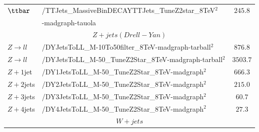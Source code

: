 \begin{table}[!ht]
\begin{center}
{\begin{tabular}{|l|l|c|}
$\ttbar$                           &   /TTJets\_MassiveBinDECAYTTJets\_TuneZ2star\_8TeV$^{2}$  &  $245.8$       \\
&-madgraph-tauola&\\
\hline
\multicolumn{3}{|c|}{$Z+jets (Drell-Yan)$ }\\
\hline
$Z \rightarrow ll$                 &   /DYJetsToLL\_M-10To50filter\_8TeV-madgraph-tarball$^{2}$      &   $876.8$               \\
$Z \rightarrow ll$                 &   /DYJetsToLL\_M-50\_TuneZ2Star\_8TeV-madgraph-tarball$^{2}$    &   $3503.7$               \\
$Z+1$jet                           &   /DY1JetsToLL\_M-50\_TuneZ2Star\_8TeV-madgraph$^{2}$           &   $666.3$               \\
$Z+2$jets                          &   /DY2JetsToLL\_M-50\_TuneZ2Star\_8TeV-madgraph$^{2}$           &   $215.0$               \\
$Z+3$jets                          &   /DY3JetsToLL\_M-50\_TuneZ2Star\_8TeV-madgraph$^{2}$           &   $60.7$               \\
$Z+4$jets                          &   /DY4JetsToLL\_M-50\_TuneZ2Star\_8TeV-madgraph$^{2}$           &   $27.3$               \\
\hline
\multicolumn{3}{|c|}{$W+jets$ }\\
\hline


\end{tabular}}
\end{center}
\end{table}
